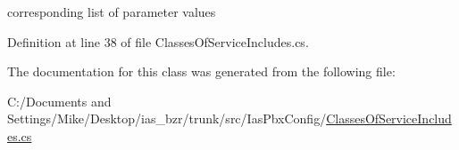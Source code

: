 corresponding list of parameter values 

Definition at line 38 of file ClassesOfServiceIncludes.cs.

The documentation for this class was generated from the following file:\begin{DoxyCompactItemize}
\item 
C:/Documents and Settings/Mike/Desktop/ias\_\-bzr/trunk/src/IasPbxConfig/\hyperlink{_classes_of_service_includes_8cs}{ClassesOfServiceIncludes.cs}\end{DoxyCompactItemize}
